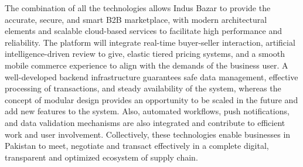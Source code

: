 The combination of all the technologies allows Indus Bazar to provide the accurate, secure, and smart B2B marketplace, with modern architectural elements and scalable cloud-based services to facilitate high performance and reliability. The platform will integrate real-time buyer-seller interaction, artificial intelligence-driven review to give, elastic tiered pricing systems, and a smooth mobile commerce experience to align with the demands of the business user. A well-developed backend infrastructure guarantees safe data management, effective processing of transactions, and steady availability of the system, whereas the concept of modular design provides an opportunity to be scaled in the future and add new features to the system. Also, automated workflows, push notifications, and data validation mechanisms are also integrated and contribute to efficient work and user involvement. Collectively, these technologies enable businesses in Pakistan to meet, negotiate and transact effectively in a complete digital, transparent and optimized ecosystem of supply chain.